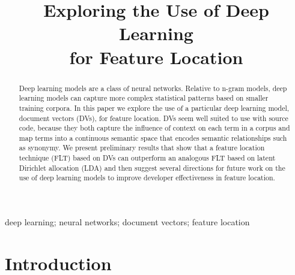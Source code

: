 \documentclass[conference]{IEEEtran}
\begin{document}
\title{Exploring the Use of Deep Learning\\ for Feature Location}
\author{
    \and
    \and
}


\maketitle

\begin{abstract}

Deep learning models are a class of neural networks. Relative to n-gram models,
deep learning models can capture more complex statistical patterns based on
smaller training corpora. In this paper we explore the use of a particular deep
learning model, document vectors (DVs), for feature location.  DVs seem
well suited to use with source code, because they both capture the influence of
context on each term in a corpus and map terms into a continuous semantic space
that encodes semantic relationships such as synonymy. We present
preliminary results that show that a feature location technique (FLT) based on
DVs can outperform an analogous FLT based on latent Dirichlet
allocation (LDA) and then suggest several directions for future work on the use of
deep learning models to improve developer effectiveness in feature location. 

\end{abstract}

\begin{IEEEkeywords}
deep learning;
neural networks;
document vectors;
feature location
\end{IEEEkeywords}

\section{Introduction}\label{introduction}

\end{document}
